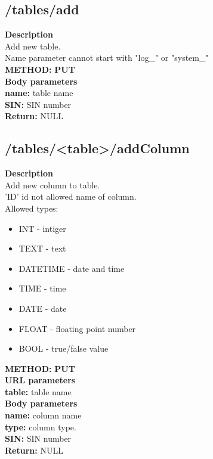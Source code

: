 \documentclass[a4paper, 12pt]{report}
\begin{document}
\subsection{/tables/add}
\textbf{\color{redText} Description} \\
Add new table. \\
Name parameter cannot start with "log\_" or "system\_" \\
\textbf{\color{redText} METHOD: } \textbf{PUT} \\
\textbf{\color{redText} Body parameters} \\
\textbf{name: } table name\\
\textbf{SIN: } SIN number\\
\textbf{\color{redText} Return: } NULL

\subsection{/tables/<table>/addColumn}
\textbf{\color{redText} Description} \\
Add new column to table. \\
'ID' id not allowed name of column.\\
Allowed types: 
\begin{itemize}
    \item INT - intiger 
    \item TEXT - text 
    \item DATETIME - date and time 
    \item TIME - time
    \item DATE - date
    \item FLOAT - floating point number
    \item BOOL - true/false value
\end{itemize}
\textbf{\color{redText} METHOD: } \textbf{PUT} \\
\textbf{\color{redText} URL parameters} \\
\textbf{table: } table name\\
\textbf{\color{redText} Body parameters} \\
\textbf{name: } column name\\
\textbf{type: } column type.\\
\textbf{SIN: } SIN number\\
\textbf{\color{redText} Return: } NULL
\end{document}
